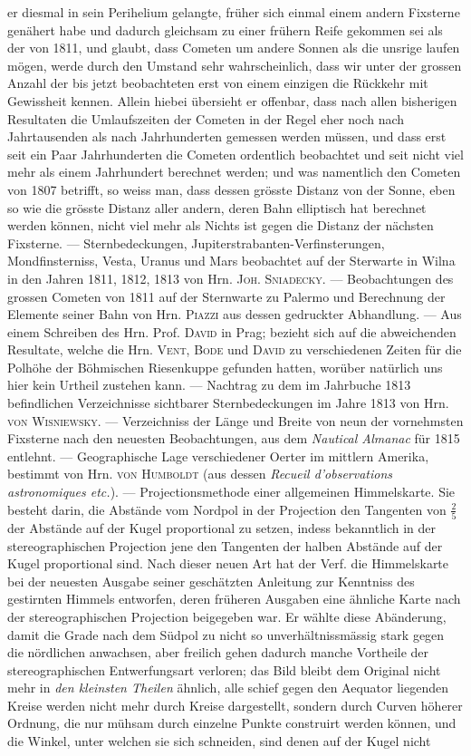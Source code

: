er diesmal in sein Perihelium gelangte, früher sich einmal einem andern Fixsterne genähert habe und dadurch gleichsam zu einer frühern Reife gekommen sei als der von 1811, und glaubt, dass Cometen um andere Sonnen als die unsrige laufen mögen, werde durch den Umstand sehr wahrscheinlich, dass wir unter der grossen Anzahl der bis jetzt beobachteten erst von einem einzigen die Rückkehr mit Gewissheit kennen. Allein hiebei übersieht er offenbar, dass nach allen bisherigen Resultaten die Umlaufszeiten der Cometen in der Regel eher noch nach Jahrtausenden als nach Jahrhunderten gemessen werden müssen, und dass erst seit ein Paar Jahrhunderten die Cometen ordentlich beobachtet und seit nicht viel mehr als einem Jahrhundert berechnet werden; und was namentlich den Cometen von 1807 betrifft, so weiss man, dass dessen grösste Distanz von der Sonne, eben so wie die grösste Distanz aller andern, deren Bahn elliptisch hat berechnet werden können, nicht viel mehr als Nichts ist gegen die Distanz der nächsten Fixsterne. — Sternbedeckungen, Jupiterstrabanten-Verfinsterungen, Mondfinsterniss, Vesta, Uranus und Mars beobachtet auf der Sterwarte in Wilna in den Jahren 1811, 1812, 1813 von Hrn. \textsc{Joh. Sniadecky}. — Beobachtungen des grossen Cometen von 1811 auf der Sternwarte zu Palermo und Berechnung der Elemente seiner Bahn von Hrn. \textsc{Piazzi} aus dessen gedruckter Abhandlung. — Aus einem Schreiben des Hrn. Prof. \textsc{David} in Prag; bezieht sich auf die abweichenden Resultate, welche die Hrn. \textsc{Vent}, \textsc{Bode} und \textsc{David} zu verschiedenen Zeiten für die Polhöhe der Böhmischen Riesenkuppe gefunden hatten, worüber natürlich uns hier kein Urtheil zustehen kann. — Nachtrag zu dem im Jahrbuche 1813 befindlichen Verzeichnisse sichtbarer Sternbedeckungen im Jahre 1813 von Hrn. \textsc{von Wisniewsky}. — Verzeichniss der Länge und Breite von neun der vornehmsten Fixsterne nach den neuesten Beobachtungen, aus dem \emph{Nautical Almanac} für 1815 entlehnt. — Geographische Lage verschiedener Oerter im mittlern Amerika, bestimmt von Hrn. \textsc{von Humboldt} (aus dessen \emph{Recueil d'observations astronomiques etc.}). — Projectionsmethode einer allgemeinen Himmelskarte. Sie besteht darin, die Abstände vom Nordpol in der Projection den Tangenten von $\frac{2}{5}$ der Abstände auf der Kugel proportional zu setzen, indess bekanntlich in der stereographischen Projection jene den Tangenten der halben Abstände auf der Kugel proportional sind. Nach dieser neuen Art hat der Verf. die Himmelskarte bei der neuesten Ausgabe seiner geschätzten Anleitung zur Kenntniss des gestirnten Himmels entworfen, deren früheren Ausgaben eine ähnliche Karte nach der stereographischen Projection beigegeben war. Er wählte diese Abänderung, damit die Grade nach dem Südpol zu nicht so unverhältnissmässig stark gegen die nördlichen anwachsen, aber freilich gehen dadurch manche Vortheile der stereographischen Entwerfungsart verloren; das Bild bleibt dem Original nicht mehr in \emph{den kleinsten Theilen} ähnlich, alle schief gegen den Aequator liegenden Kreise werden nicht mehr durch Kreise dargestellt, sondern durch Curven höherer Ordnung, die nur mühsam durch einzelne Punkte construirt werden können, und die Winkel, unter welchen sie sich schneiden, sind denen auf der Kugel nicht 